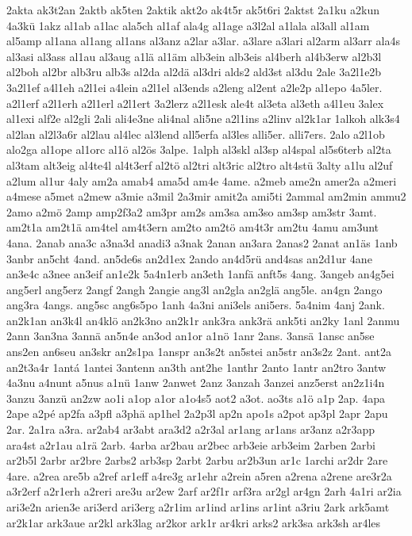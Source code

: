 {2akta
ak3t2an
2aktb
ak5ten
2aktik
akt2o
ak4t5r
ak5t6ri
2aktst
2a1ku
a2kun
4a3kü
1akz
al1ab
a1lac
ala5ch
al1af
ala4g
al1age
a3l2al
a1lala
al3all
al1am
al5amp
al1ana
al1ang
al1ans
al3anz
a2lar
a3lar.
a3lare
a3lari
al2arm
al3arr
ala4s
al3asi
al3ass
al1au
al3aug
a1lä
al1äm
alb3ein
alb3eis
al4berh
al4b3erw
al2b3l
al2boh
al2br
alb3ru
alb3s
al2da
al2dä
al3dri
alds2
ald3st
al3du
2ale
3a2l1e2b
3a2l1ef
a4l1eh
a2l1ei
a4lein
a2l1el
al3ends
a2leng
al2ent
a2le2p
al1epo
4a5ler.
a2l1erf
a2l1erh
a2l1erl
a2l1ert
3a2lerz
a2l1esk
ale4t
al3eta
al3eth
a4l1eu
3alex
al1exi
alf2e
al2gli
2ali
ali4e3ne
ali4nal
ali5ne
a2l1ins
a2linv
al2k1ar
1alkoh
alk3s4
al2lan
al2l3a6r
al2lau
al4lec
al3lend
all5erfa
al3les
alli5er.
alli7ers.
2alo
a2l1ob
alo2ga
al1ope
al1orc
al1ö
al2ös
3alpe.
1alph
al3skl
al3sp
al4spal
al5s6terb
al2ta
al3tam
alt3eig
al4te4l
al4t3erf
al2tö
al2tri
alt3ric
al2tro
alt4stü
3alty
a1lu
al2uf
a2lum
al1ur
4aly
am2a
amab4
ama5d
am4e
4ame.
a2meb
ame2n
amer2a
a2meri
a4mese
a5met
a2mew
a3mie
a3mil
2a3mir
amit2a
ami5ti
2ammal
am2min
ammu2
2amo
a2mö
2amp
amp2f3a2
am3pr
am2s
am3sa
am3so
am3sp
am3str
3amt.
am2t1a
am2t1ä
am4tel
am4t3ern
am2to
am2tö
am4t3r
am2tu
4amu
am3unt
4ana.
2anab
ana3c
a3na3d
anadi3
a3nak
2anan
an3ara
2anas2
2anat
an1äs
1anb
3anbr
an5cht
4and.
an5de6s
an2d1ex
2ando
an4d5rü
and4sas
an2d1ur
4ane
an3e4c
a3nee
an3eif
an1e2k
5a4n1erb
an3eth
1anfä
anft5s
4ang.
3angeb
an4g5ei
ang5erl
ang5erz
2angf
2angh
2angie
ang3l
an2gla
an2glä
ang5le.
an4gn
2ango
ang3ra
4angs.
ang5sc
ang6s5po
1anh
4a3ni
ani3els
ani5ers.
5a4nim
4anj
2ank.
an2k1an
an3k4l
an4klö
an2k3no
an2k1r
ank3ra
ank3rä
ank5ti
an2ky
1anl
2anmu
2ann
3an3na
3annä
an5n4e
an3od
an1or
a1nö
1anr
2ans.
3ansä
1ansc
an5se
ans2en
an6seu
an3skr
an2s1pa
1anspr
an3s2t
an5stei
an5str
an3s2z
2ant.
ant2a
an2t3a4r
1antá
1antei
3antenn
an3th
ant2he
1anthr
2anto
1antr
an2tro
3antw
4a3nu
a4nunt
a5nus
a1nü
1anw
2anwet
2anz
3anzah
3anzei
anz5erst
an2z1i4n
3anzu
3anzü
an2zw
ao1i
a1op
a1or
a1o4s5
aot2
a3ot.
ao3ts
a1ö
a1p
2ap.
4apa
2ape
a2pé
ap2fa
a3pfl
a3phä
ap1hel
2a2p3l
ap2n
apo1s
a2pot
ap3pl
2apr
2apu
2ar.
2a1ra
a3ra.
ar2ab4
ar3abt
ara3d2
a2r3al
ar1ang
ar1ans
ar3anz
a2r3app
ara4st
a2r1au
a1rä
2arb.
4arba
ar2bau
ar2bec
arb3eie
arb3eim
2arben
2arbi
ar2b5l
2arbr
ar2bre
2arbs2
arb3sp
2arbt
2arbu
ar2b3un
ar1c
1archi
ar2dr
2are
4are.
a2rea
are5b
a2ref
ar1eff
a4re3g
ar1ehr
a2rein
a5ren
a2rena
a2rene
are3r2a
a3r2erf
a2r1erh
a2reri
are3u
ar2ew
2arf
ar2f1r
arf3ra
ar2gl
ar4gn
2arh
4a1ri
ar2ia
ari3e2n
arien3e
ari3erd
ari3erg
a2r1im
ar1ind
ar1ins
ar1int
a3riu
2ark
ark5amt
ar2k1ar
ark3aue
ar2kl
ark3lag
ar2kor
ark1r
ar4kri
arks2
ark3sa
ark3sh
ar4les
}
